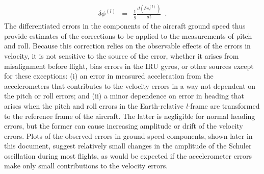 \documentclass[12pt,twoside,english,12pt,twoside,english]{article}\usepackage[]{graphicx}\usepackage[]{color}
\let\OrgIndex\index
\renewcommand*{\index}[1]{\OrgIndex{#1}}
\begin{document}
\begin{eqnarray}
\delta\phi^{(l)} & = & \frac{1}{g}\frac{d(\delta v_{e}^{(l)})}{dt}\,\,\,.\label{eq:delta-phi}
\end{eqnarray}
The differentiated errors in the
components of the aircraft ground speed thus
provide estimates of the corrections to be applied to the measurements
of pitch and roll.
Because this correction relies on the observable effects of the errors
in velocity, it is not sensitive to the source of the error, whether
it arises from misalignment before flight, bias errors in the IRU
gyros, or other sources except for
these exceptions: (i) an error in measured acceleration
from the accelerometers that contributes
to the velocity errors in a way not dependent
on the pitch or roll errors; and (ii) a minor dependence on error
in heading that arises when the pitch and roll errors in the Earth-relative
\emph{l-}frame are
transformed to the reference
frame of the aircraft. The latter is negligible for normal heading
errors, but the former can cause increasing amplitude or drift of
the velocity errors. Plots of the observed errors in ground-speed
components, shown later in this document, suggest relatively small
changes in the amplitude of the Schuler oscillation
during most flights, as would be expected if the accelerometer errors
make only small contributions to the velocity errors.
\end{document}
